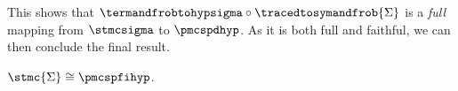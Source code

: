This shows that \(
    \termandfrobtohypsigma \circ \tracedtosymandfrob{\Sigma}
\) is a \emph{full} mapping from \(\stmcsigma\) to \(\pmcspdhyp\).
As it is both full and faithful, we can then conclude the final result.

\begin{corollary}\label{cor:stmc-graph-iso}
    \(\stmc{\Sigma} \cong \pmcspfihyp\).
\end{corollary}